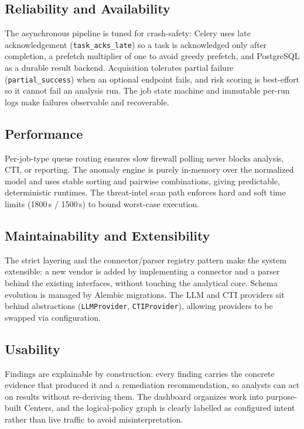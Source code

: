 \subsection{Reliability and Availability}
\label{sec:ch3-nfr-reliability}
The asynchronous pipeline is tuned for crash-safety: Celery uses late acknowledgement (\texttt{task\_acks\_late}) so a task is acknowledged only after completion, a prefetch multiplier of one to avoid greedy prefetch, and PostgreSQL as a durable result backend. Acquisition tolerates partial failure (\texttt{partial\_success}) when an optional endpoint fails, and risk scoring is best-effort so it cannot fail an analysis run. The job state machine and immutable per-run logs make failures observable and recoverable.

\subsection{Performance}
\label{sec:ch3-nfr-performance}
Per-job-type queue routing ensures slow firewall polling never blocks analysis, CTI, or reporting. The anomaly engine is purely in-memory over the normalized model and uses stable sorting and pairwise combinations, giving predictable, deterministic runtimes. The threat-intel scan path enforces hard and soft time limits (1800\,s / 1500\,s) to bound worst-case execution.

\subsection{Maintainability and Extensibility}
\label{sec:ch3-nfr-maintainability}
The strict layering and the connector/parser registry pattern make the system extensible: a new vendor is added by implementing a connector and a parser behind the existing interfaces, without touching the analytical core. Schema evolution is managed by Alembic migrations. The LLM and CTI providers sit behind abstractions (\texttt{LLMProvider}, \texttt{CTIProvider}), allowing providers to be swapped via configuration.

\subsection{Usability}
\label{sec:ch3-nfr-usability}
Findings are explainable by construction: every finding carries the concrete evidence that produced it and a remediation recommendation, so analysts can act on results without re-deriving them. The dashboard organizes work into purpose-built Centers, and the logical-policy graph is clearly labelled as configured intent rather than live traffic to avoid misinterpretation.

